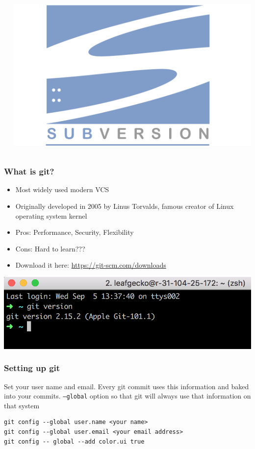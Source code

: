 \documentclass[12pt]{beamer}
\begin{document}
\begin{frame}
\begin{columns}
\begin{column}{0.33\linewidth}
	\end{column}
	\begin{column}{0.33\linewidth}
		\includegraphics[width=0.8\linewidth]{subversion_Logo}
	\end{column}
\end{columns}
\end{frame}

\begin{frame}
\frametitle{What is git?}
\begin{itemize}
	\item Most widely used modern VCS
	\item Originally developed in 2005 by Linus Torvalds, famous creator of Linux operating system kernel
	\item Pros: Performance, Security, Flexibility
	\item Cons: Hard to learn???
	\item Download it here: \url{https://git-scm.com/downloads}
\end{itemize}
\begin{center}	
	\includegraphics[width=0.5\linewidth]{git_screenshot}
\end{center}
\end{frame}

\begin{frame}[fragile]
\frametitle{Setting up git}
Set your user name and email. Every git commit uses this information and baked into your commits. \texttt{--global} option so that git will always use that information on that system
\begin{verbatim}
git config --global user.name <your name>
git config --global user.email <your email address>
git config -- global --add color.ui true
\end{verbatim}
\end{frame}
\end{document}

